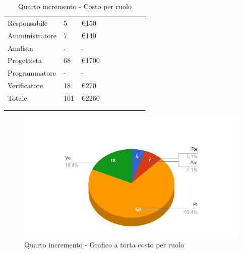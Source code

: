 {{\begin{longtable}{C{.4\freewidth} C{.2\freewidth} C{.2\freewidth} C{.2\freewidth} C{.2\freewidth} C{.2\freewidth} C{.2\freewidth} C{.2\freewidth} C{.2\freewidth}}
        Responsabile  & 5 & €150\\
        Amministratore  & 7& €140 \\
        Analista &- & -\\
        Progettista &68 &€1700\\
        Programmatore &- & -\\
        Verificatore &18 &€270\\
        Totale&101&€2260\\
        \bottomrule
      \\
        \caption{Quarto incremento - Costo per ruolo}

        \end{longtable}
        \begin{figure}[H]
          \includegraphics[width=15cm]{sezioni/Images/quartoT.png}
          \centering
          \caption{Quarto incremento - Grafico a torta costo per ruolo}
       \end{figure}
    }
    }

